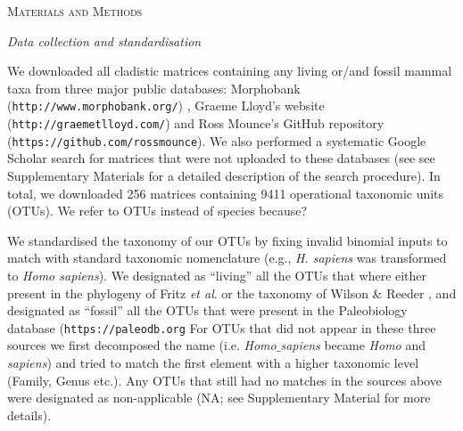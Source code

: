 \documentclass[12pt,letterpaper]{article}
\renewcommand{\section}[1]{%
\bigskip
\begin{center}
\begin{Large}
\normalfont\scshape #1
\medskip
\end{Large}
\end{center}}
\renewcommand{\subsection}[1]{%
\bigskip
\begin{center}
\begin{large}
\normalfont\itshape #1
\end{large}
\end{center}}
\begin{document}
%
%
 

\section{Materials and Methods}
\subsection{Data collection and standardisation}
We downloaded all cladistic matrices containing any living or/and fossil mammal taxa from three major public databases: Morphobank (\texttt{http://www.morphobank.org/}) \citep{morphobank}, Graeme Lloyd's website (\texttt{http://graemetlloyd.com/}) and Ross Mounce's GitHub repository (\texttt{https://github.com/rossmounce}).
We also performed a systematic Google Scholar search for matrices that were not uploaded to these databases (see see Supplementary Materials for a detailed description of the search procedure).
In total, we downloaded 256 %
matrices containing 9411 %
operational taxonomic units (OTUs). %
We refer to OTUs instead of species because?


We standardised the taxonomy of our OTUs by fixing invalid binomial inputs to match with standard taxonomic nomenclature (e.g., \textit{H. sapiens} was transformed to \textit{Homo sapiens}).
We designated as ``living'' all the OTUs that where either present in the phylogeny of Fritz \textit{et al}. \citep{FritzTree} or the taxonomy of Wilson \& Reeder \citep{wilson2005mammal}, and designated as ``fossil'' all the OTUs that were present in the Paleobiology database (\texttt{https://paleodb.org} %
For OTUs that did not appear in these three sources we first decomposed the name (i.e. \textit{Homo$\_$sapiens} became \textit{Homo} and \textit{sapiens}) and tried to match the first element with a higher taxonomic level (Family, Genus etc.).
Any OTUs that still had no matches in the sources above were designated as non-applicable (NA; see Supplementary Material for more details).
\end{document}
